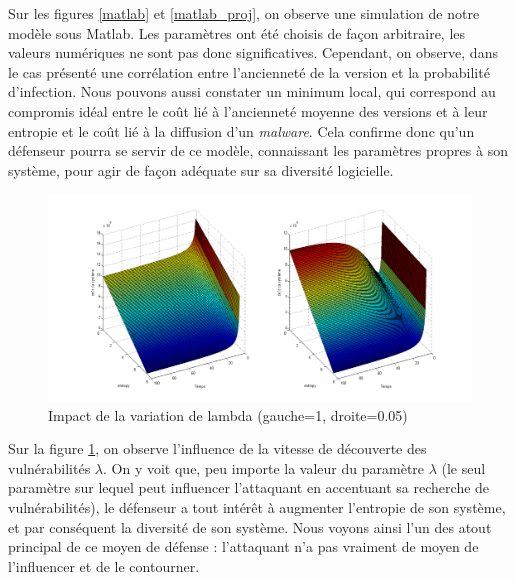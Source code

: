 Sur les figures \ref{matlab} et \ref{matlab_proj}, on observe une simulation de notre modèle sous Matlab. Les paramètres ont été choisis de façon arbitraire, les valeurs numériques ne sont pas donc significatives. Cependant, on observe, dans le cas présenté une corrélation entre l’ancienneté de la version et la probabilité d’infection. Nous pouvons aussi constater un minimum local, qui correspond au compromis idéal entre le coût lié à l'ancienneté moyenne des versions et à leur entropie et le coût lié à la diffusion d'un \textit{malware}. Cela confirme donc qu'un défenseur pourra se servir de ce modèle, connaissant les paramètres propres à son système, pour agir de façon adéquate sur sa diversité logicielle.

\begin{figure}[!ht]
\centering
     \includegraphics[width=1.0\linewidth]{Paul/Matlab/lambda_var.png}
     \caption{Impact de la variation de lambda (gauche=1, droite=0.05)}
     \label{lambda}
\end{figure}

Sur la figure \ref{lambda}, on observe l'influence de la vitesse de découverte des vulnérabilités $\lambda$. On y voit que, peu importe la valeur du paramètre $\lambda$ (le seul paramètre sur lequel peut influencer l'attaquant en accentuant sa recherche de vulnérabilités), le défenseur a tout intérêt à augmenter l'entropie de son système, et par conséquent la diversité de son système. Nous voyons ainsi l'un des atout principal de ce moyen de défense : l'attaquant n'a pas vraiment de moyen de l'influencer et de le contourner.